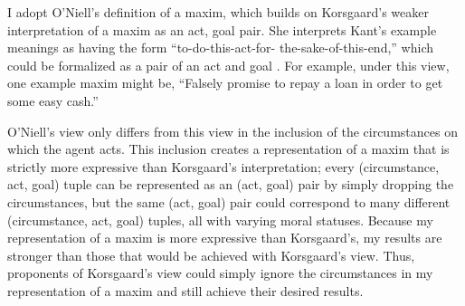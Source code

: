 %
\begin{isabellebody}%
%
%
\isadelimtheory
%
\endisadelimtheory
%
\isatagtheory
%
\endisatagtheory
{\isafoldtheory}%
%
\isadelimtheory
%
\endisadelimtheory
%
\isadelimdocument
%
\endisadelimdocument
%
\isatagdocument
%
\isamarkuptrue%
%
\isamarkuptrue%
%
\endisatagdocument
{\isafolddocument}%
%
\isadelimdocument
%
\endisadelimdocument
%
\begin{isamarkuptext}%
I adopt O'Niell's definition of a maxim, which builds on Korsgaard's weaker interpretation of 
a maxim as an act, goal pair. She interprets Kant's example meanings as having the form ``to-do-this-act-for-
the-sake-of-this-end,'' which could be formalized as a pair of an act and goal \citep{actingforareason}.
For example, under this view, one example maxim might be, ``Falsely promise to repay a loan in order
to get some easy cash.'' 

O'Niell's view only differs from this view in the inclusion of the circumstances
on which the agent acts. This inclusion creates a representation of a maxim that is strictly more expressive than 
Korsgaard's interpretation; every (circumstance, act, goal) tuple can be represented as an (act, goal) pair
by simply dropping the circumstances, but the same (act, goal) pair could correspond to many different
(circumstance, act, goal) tuples, all with varying moral statuses. Because my representation of a maxim
is more expressive than Korsgaard's, my results are stronger than those that would be achieved with 
Korsgaard's view. Thus, proponents of Korsgaard's view could simply ignore the circumstances in my
representation of a maxim and still achieve their desired results. 


\end{isamarkuptext}
\end{isabellebody}
